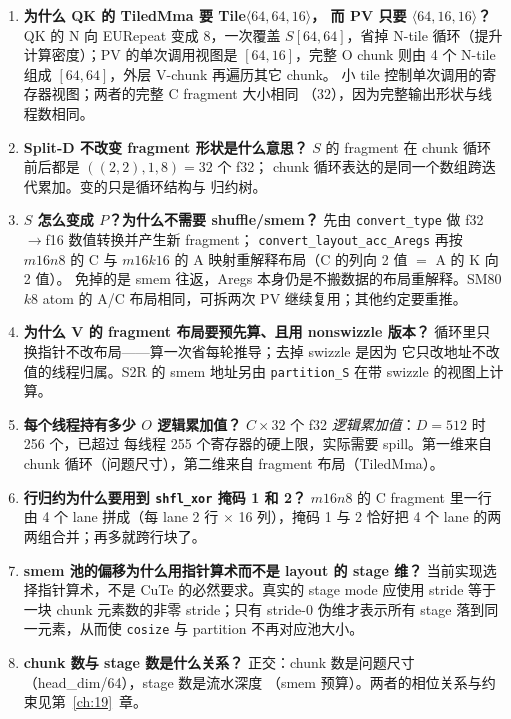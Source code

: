 \begin{enumerate}[itemsep=3pt,topsep=3pt]
  \item \textbf{为什么 QK 的 TiledMma 要 Tile$\langle64,64,16\rangle$，
        而 PV 只要 $\langle64,16,16\rangle$？}
        QK 的 N 向 EURepeat 变成 8，一次覆盖 $S[64,64]$，省掉 N-tile
        循环（提升计算密度）；PV 的单次调用视图是 $[64,16]$，完整 O chunk
        则由 4 个 N-tile 组成 $[64,64]$，外层 V-chunk 再遍历其它 chunk。
        小 tile 控制单次调用的寄存器视图；两者的完整 C fragment 大小相同
        （$32$），因为完整输出形状与线程数相同。
  \item \textbf{Split-D 不改变 fragment 形状是什么意思？}
        $S$ 的 fragment 在 chunk 循环前后都是 $((2,2),1,8)=32$ 个 f32；
        chunk 循环表达的是同一个数组跨迭代累加。变的只是循环结构与
        归约树。
  \item \textbf{$S$ 怎么变成 $P$？为什么不需要 shuffle/smem？}
        先由 \texttt{convert\_type} 做 f32$\to$f16 数值转换并产生新 fragment；
        \texttt{convert\_\allowbreak{}layout\_\allowbreak{}acc\_\allowbreak{}Aregs} 再按 $m16n8$ 的 C 与
        $m16k16$ 的 A 映射重解释布局（C 的列向 2 值 $=$ A 的 K 向 2 值）。
        免掉的是 smem 往返，Aregs 本身仍是不搬数据的布局重解释。SM80
        $k8$ atom 的 A/C 布局相同，可拆两次 PV 继续复用；其他约定要重推。
  \item \textbf{为什么 V 的 fragment 布局要预先算、且用 nonswizzle 版本？}
        循环里只换指针不改布局——算一次省每轮推导；去掉 swizzle 是因为
        它只改地址不改值的线程归属。S2R 的 smem 地址另由
        \texttt{partition\_S} 在带 swizzle 的视图上计算。
  \item \textbf{每个线程持有多少 $O$ 逻辑累加值？}
        $C\times32$ 个 f32 \emph{逻辑累加值}：$D=512$ 时 256 个，已超过
        每线程 255 个寄存器的硬上限，实际需要 spill。第一维来自 chunk
        循环（问题尺寸），第二维来自 fragment 布局（TiledMma）。
  \item \textbf{行归约为什么要用到 \texttt{shfl\_xor} 掩码 1 和 2？}
        $m16n8$ 的 C fragment 里一行由 4 个 lane 拼成（每 lane 2 行 $\times$
        16 列），掩码 1 与 2 恰好把 4 个 lane 的两两组合并；再多就跨行块了。
  \item \textbf{smem 池的偏移为什么用指针算术而不是 layout 的 stage 维？}
        当前实现选择指针算术，不是 CuTe 的必然要求。真实的 stage mode
        应使用 stride 等于一块 chunk 元素数的非零 stride；只有 stride-0
        伪维才表示所有 stage 落到同一元素，从而使 \texttt{cosize} 与
        partition 不再对应池大小。
  \item \textbf{chunk 数与 stage 数是什么关系？}
        正交：chunk 数是问题尺寸（head\_dim/64），stage 数是流水深度
        （smem 预算）。两者的相位关系与约束见第~\ref{ch:19}~章。
\end{enumerate}

